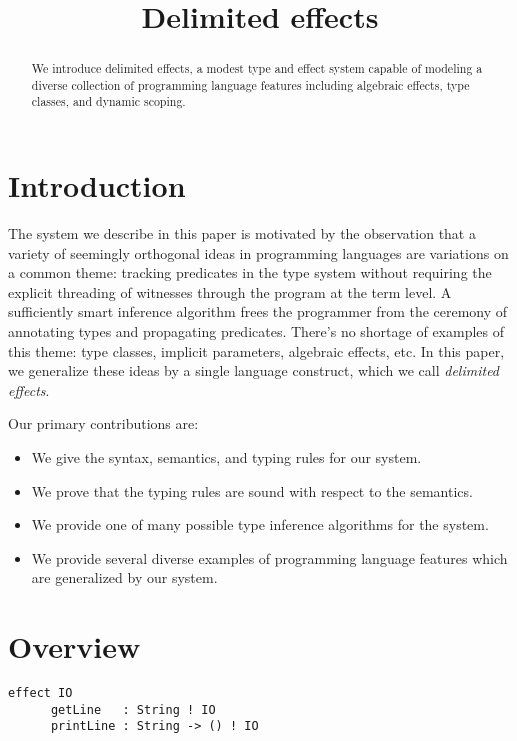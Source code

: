 \documentclass[12pt]{article}
\title{Delimited effects}
\date{}
\begin{document}
  \maketitle

  \begin{abstract}
    We introduce delimited effects, a modest type and effect system capable of modeling a diverse collection of programming language features including algebraic effects, type classes, and dynamic scoping.
  \end{abstract}

  \section{Introduction}

  The system we describe in this paper is motivated by the observation that a variety of seemingly orthogonal ideas in programming languages are variations on a common theme: tracking predicates in the type system without requiring the explicit threading of witnesses through the program at the term level. A sufficiently smart inference algorithm frees the programmer from the ceremony of annotating types and propagating predicates. There's no shortage of examples of this theme: type classes, implicit parameters, algebraic effects, etc. In this paper, we generalize these ideas by a single language construct, which we call \emph{delimited effects}.

  Our primary contributions are:

  \begin{itemize}
    \item We give the syntax, semantics, and typing rules for our system.
    \item We prove that the typing rules are sound with respect to the semantics.
    \item We provide one of many possible type inference algorithms for the system.
    \item We provide several diverse examples of programming language features which are generalized by our system.
  \end{itemize}

  \section{Overview}

  \begin{lstlisting}[gobble=4]
    effect IO
      getLine   : String ! IO
      printLine : String -> () ! IO
  \end{lstlisting}
\end{document}
